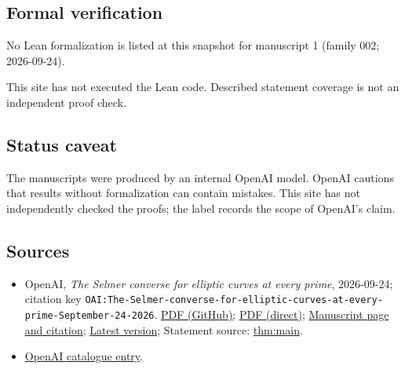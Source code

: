 \documentclass[11pt]{article}
\begin{document}
\subsection{Formal verification}
No Lean formalization is listed at this snapshot for manuscript 1 (family 002; 2026-09-24).

This site has not executed the Lean code. Described statement coverage is not an independent proof check.

\subsection{Status caveat}
The manuscripts were produced by an internal OpenAI model. OpenAI cautions that results without formalization can contain mistakes. This site has not independently checked the proofs; the label records the scope of OpenAI's claim.

\subsection{Sources}
\begin{itemize}
\item OpenAI, \emph{The Selmer converse for elliptic curves at every prime}, 2026-09-24; citation key \texttt{OAI:The-Selmer-converse-for-elliptic-curves-at-every-prime-September-24-2026}. \href{https://github.com/openai/math/blob/adc7f1241b42e322a6451854ab7e4b4c146bf78a/preprints/The-Selmer-converse-for-elliptic-curves-at-every-prime-September-24-2026/main.pdf}{PDF (GitHub)}; \href{https://github.com/openai/math/raw/adc7f1241b42e322a6451854ab7e4b4c146bf78a/preprints/The-Selmer-converse-for-elliptic-curves-at-every-prime-September-24-2026/main.pdf}{PDF (direct)}; \href{https://github.com/openai/math/blob/adc7f1241b42e322a6451854ab7e4b4c146bf78a/preprints/The-Selmer-converse-for-elliptic-curves-at-every-prime-September-24-2026/README.md}{Manuscript page and citation}; \href{https://github.com/openai/math/blob/main/preprints/The-Selmer-converse-for-elliptic-curves-at-every-prime-September-24-2026/main.pdf}{Latest version}; Statement source: \href{https://github.com/openai/math/blob/adc7f1241b42e322a6451854ab7e4b4c146bf78a/preprints/The-Selmer-converse-for-elliptic-curves-at-every-prime-September-24-2026/build/sections/01-introduction.tex\#L25}{thm:main}.
\item \href{https://github.com/openai/math/blob/adc7f1241b42e322a6451854ab7e4b4c146bf78a/CONTENTS.md}{OpenAI catalogue entry}.
\end{itemize}
\end{document}
